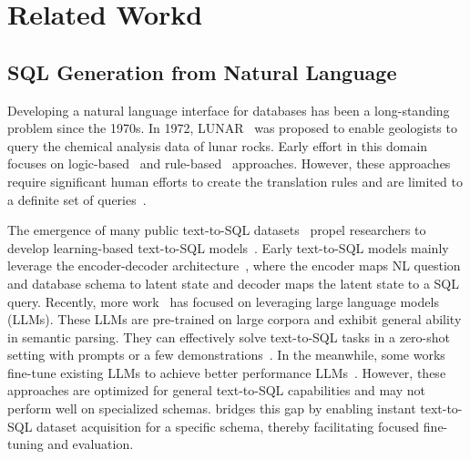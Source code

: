 \section{Related Workd}

\subsection{SQL Generation from Natural Language}



Developing a natural language interface for databases has been a long-standing problem since the 1970s. In 1972,  LUNAR~\cite{lunar} was proposed to enable geologists to query the chemical analysis data of lunar rocks. 
Early effort in this domain focuses on logic-based~\cite{logic1, logic2} and rule-based~\cite{rule1, SQLizer, ATHENA, Semantic-Tractability, construct_interface} approaches. However, these approaches require significant human efforts to create the translation rules and are limited to a definite set of queries~\cite{where-are-we, Semantic-Tractability}.

The emergence of many public text-to-SQL datasets~\cite{spider, wikisql, SQLizer, bird} propel researchers to develop learning-based text-to-SQL models~\cite{smbop, STEPS, ratsql, editsql, picard, sqlova}.
Early text-to-SQL models mainly leverage the encoder-decoder architecture~\cite{lin2020bridging, zhong-etal-2020-grounded, seq2sql}, where the encoder maps NL question and database schema to latent state and decoder maps the latent state to a SQL query. 
Recently, more work~\cite{xiyan, dailsql, distillery} has focused on leveraging large language models (LLMs).
These LLMs are pre-trained on large corpora and exhibit general ability in semantic parsing. 
They can effectively solve text-to-SQL tasks in a zero-shot setting with prompts or a few demonstrations~\cite{thorpe2024dubosqldiverseretrievalaugmentedgeneration, -dialsql}.
In the meanwhile, some works fine-tune existing LLMs to achieve better performance LLMs~\cite{codes, finetune_sql_llm, sqlcoder, NSText2SQL}. However, these approaches are optimized for general text-to-SQL capabilities and may not perform well on specialized schemas. {\tool} bridges this gap by enabling instant text-to-SQL dataset acquisition for a specific schema, thereby facilitating focused fine-tuning and evaluation.


